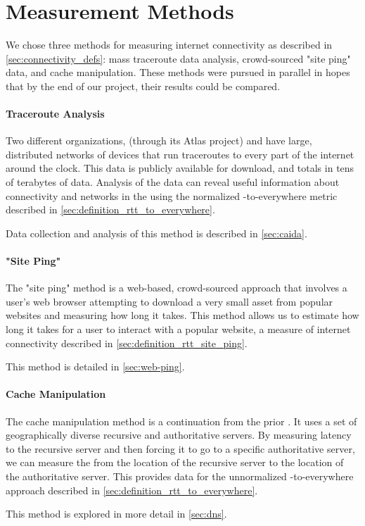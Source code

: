 \section{Measurement Methods}\label{sec:methods_overview}

We chose three methods for measuring internet connectivity as described in \cref{sec:connectivity_defs}: mass traceroute data analysis, crowd-sourced "site ping" data, and \dns cache manipulation. These methods were pursued in parallel in hopes that by the end of our project, their results could be compared.


\paragraph{Traceroute Analysis} Two different organizations, \ripe (through its Atlas project) and \caida have large, distributed networks of devices that run traceroutes to every part of the internet around the clock. This data is publicly available for download, and totals in tens of terabytes of data. Analysis of the data can reveal useful information about connectivity and networks in the \us using the normalized \rtt-to-everywhere metric described in \cref{sec:definition_rtt_to_everywhere}.

Data collection and analysis of this method is described in \cref{sec:caida}.

\paragraph{"Site Ping"} The "site ping" method is a web-based, crowd-sourced approach that involves a user's web browser attempting to download a very small asset from popular websites and measuring how long it takes. This method allows us to estimate how long it takes for a user to interact with a popular website, a measure of internet connectivity described in \cref{sec:definition_rtt_site_ping}.

This method is detailed in \cref{sec:web-ping}.

\paragraph{\DNS Cache Manipulation} The \dns cache manipulation method is a continuation from the prior \mqp \cite{Fakult2019}. It uses a set of geographically diverse recursive and authoritative \dns servers. By measuring latency to the recursive \dns server and then forcing it to go to a specific authoritative server, we can measure the \rtt from the location of the recursive server to the location of the authoritative server. This provides data for the unnormalized \rtt-to-everywhere approach described in \cref{sec:definition_rtt_to_everywhere}.

This method is explored in more detail in \cref{sec:dns}.
